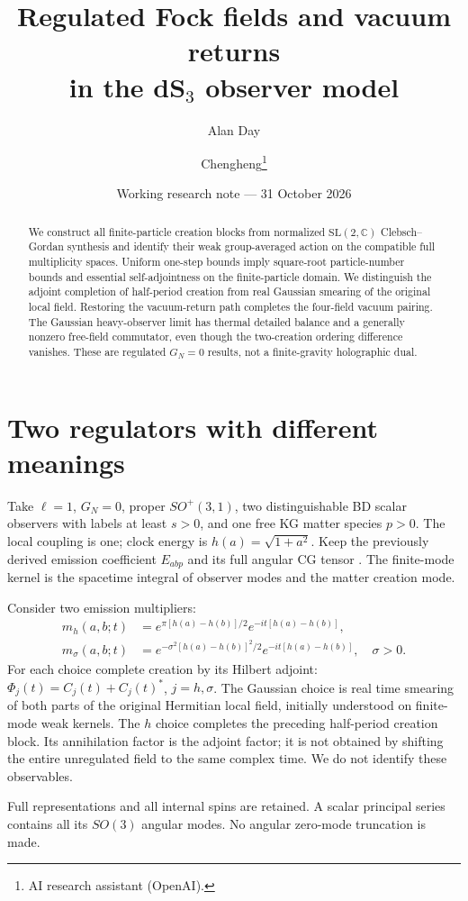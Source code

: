 \documentclass[11pt,a4paper]{article}
\title{Regulated Fock fields and vacuum returns\\in the dS$_3$ observer model}
\author{Alan Day \and Chengheng\thanks{AI research assistant (OpenAI).}}
\date{Working research note --- 31 October 2026}
\begin{document}
\maketitle
\begin{abstract}
We construct all finite-particle creation blocks from normalized
$\mathrm{SL}(2,\mathbb C)$ Clebsch--Gordan synthesis and identify their
weak group-averaged action on the compatible full multiplicity spaces.
Uniform one-step bounds imply square-root particle-number bounds and
essential self-adjointness on the finite-particle domain.
We distinguish the adjoint completion of half-period creation from
real Gaussian smearing of the original local field. Restoring the
vacuum-return path completes the four-field vacuum pairing. The
Gaussian heavy-observer limit has thermal detailed balance and a
generally nonzero free-field commutator, even though the two-creation
ordering difference vanishes. These are regulated $G_N=0$ results,
not a finite-gravity holographic dual.
\end{abstract}
\section{Two regulators with different meanings}
Take $\ell=1$, $G_N=0$, proper $SO^+(3,1)$, two distinguishable BD
scalar observers with labels at least $s>0$, and one free KG matter
species $p>0$. The local coupling is one; clock energy is
$h(a)=\sqrt{1+a^2}$. Keep the previously derived emission coefficient
$E_{abp}$ and its full angular CG tensor \cite{prior,kl}.
The finite-mode kernel is the spacetime integral of observer modes
and the matter creation mode.

Consider two emission multipliers:
\begin{align}
 m_h(a,b;t)&=e^{\pi[h(a)-h(b)]/2}e^{-it[h(a)-h(b)]},\nonumber\\
 m_\sigma(a,b;t)&=
 e^{-\sigma^2[h(a)-h(b)]^2/2}e^{-it[h(a)-h(b)]},\quad \sigma>0.
 \label{reg}
\end{align}
For each choice complete creation by its Hilbert adjoint:
$\Phi_j(t)=C_j(t)+C_j(t)^*$, $j=h,\sigma$.
The Gaussian choice is real time smearing of both parts of the original
Hermitian local field, initially understood on finite-mode weak kernels.
The $h$ choice completes the preceding half-period creation block.
Its annihilation factor is the adjoint factor; it is not obtained by
shifting the entire unregulated field to the same complex time.
We do not identify these observables.

Full representations and all internal spins are retained. A scalar
principal series contains all its $SO(3)$ angular modes.
No angular zero-mode truncation is made.
\end{document}
